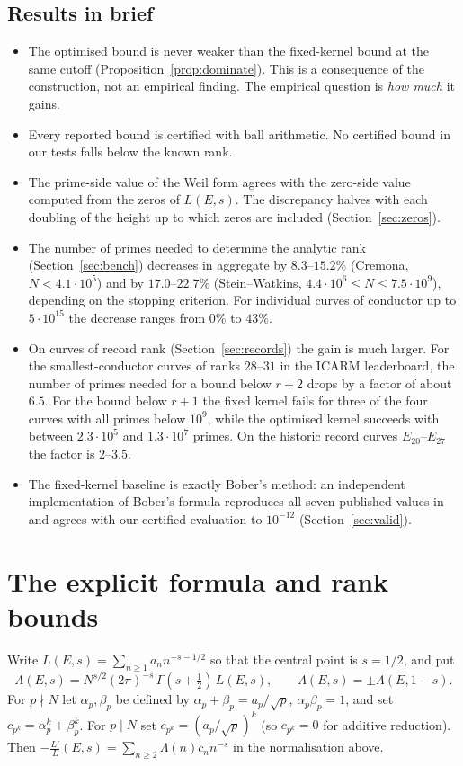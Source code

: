 \documentclass[11pt]{amsart}
\theoremstyle{remark}
\theoremstyle{definition}
\begin{document}
\subsection*{Results in brief}
\begin{itemize}
\item The optimised bound is never weaker than the fixed-kernel bound at the same cutoff (Proposition~\ref{prop:dominate}). This is a consequence of the construction, not an empirical finding. The empirical question is \emph{how much} it gains.
\item Every reported bound is certified with ball arithmetic. No certified bound in our tests falls below the known rank.
\item The prime-side value of the Weil form agrees with the zero-side value computed from the zeros of $L(E,s)$. The discrepancy halves with each doubling of the height up to which zeros are included (Section~\ref{sec:zeros}).
\item The number of primes needed to determine the analytic rank (Section~\ref{sec:bench}) decreases in aggregate by $8.3$--$15.2\%$ (Cremona, $N<4.1\cdot 10^5$) and by $17.0$--$22.7\%$ (Stein--Watkins, $4.4\cdot10^6\le N\le 7.5\cdot 10^9$), depending on the stopping criterion. For individual curves of conductor up to $5\cdot 10^{15}$ the decrease ranges from $0\%$ to $43\%$.
\item On curves of record rank (Section~\ref{sec:records}) the gain is much larger. For the smallest-conductor curves of ranks $28$--$31$ in the ICARM leaderboard, the number of primes needed for a bound below $r+2$ drops by a factor of about $6.5$. For the bound below $r+1$ the fixed kernel fails for three of the four curves with all primes below $10^9$, while the optimised kernel succeeds with between $2.3\cdot10^5$ and $1.3\cdot10^7$ primes. On the historic record curves $E_{20}$--$E_{27}$ the factor is $2$--$3.5$.
\item The fixed-kernel baseline is exactly Bober's method: an independent implementation of Bober's formula reproduces all seven published values in~\cite{Bober,KSW} and agrees with our certified evaluation to $10^{-12}$ (Section~\ref{sec:valid}).
\end{itemize}

\section{The explicit formula and rank bounds}

Write $L(E,s)=\sum_{n\ge1} a_n n^{-s-1/2}$ so that the central point is $s=1/2$, and put
\[
\Lambda(E,s) = N^{s/2}(2\pi)^{-s}\,\Gamma(s+\tfrac12)\,L(E,s), \qquad \Lambda(E,s)=\pm\Lambda(E,1-s).
\]
For $p\nmid N$ let $\alpha_p,\beta_p$ be defined by $\alpha_p+\beta_p=a_p/\sqrt p$, $\alpha_p\beta_p=1$, and set $c_{p^k}=\alpha_p^k+\beta_p^k$. For $p\mid N$ set $c_{p^k}=(a_p/\sqrt p)^k$ (so $c_{p^k}=0$ for additive reduction). Then $-\frac{L'}{L}(E,s)=\sum_{n\ge2}\Lambda(n)c_n n^{-s}$ in the normalisation above.
\end{document}
